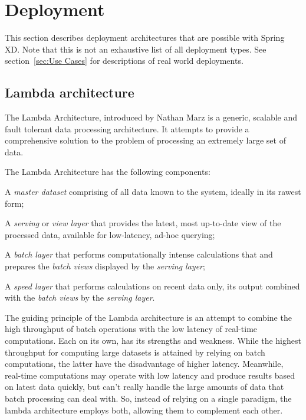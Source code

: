 \section{Deployment}
This section describes deployment architectures that are possible with Spring XD.
Note that this is not an exhaustive list of all deployment types. See
section~\ref{sec:Use Cases} for descriptions of real world deployments.

\subsection{Lambda architecture}

The Lambda Architecture, introduced by Nathan Marz \cite{lambda-architecture-paper}
is a generic, scalable and fault tolerant data  processing architecture. It attempts
to provide a comprehensive solution to the problem of processing an extremely large
set of data.

The Lambda Architecture has the following components:

\begin{itemize*}
\item A \emph{master dataset} comprising of all data known to the system,
ideally in its rawest form;
\item A \emph{serving} or \emph{view layer} that provides the latest,
most up-to-date view of the processed data, available for low-latency,
ad-hoc querying;
\item A \emph{batch layer} that performs computationally intense 
calculations that and prepares the \emph{batch views} displayed by the 
\emph{serving layer};
\item A \emph{speed layer} that performs calculations on recent data only, 
its output combined with the \emph{batch views} by the \emph{serving layer}.
\end{itemize*}

The guiding principle of the Lambda architecture is an attempt to combine the
high throughput of batch operations with the low latency of real-time
computations. Each on its own, has its strengths and weakness. While the
highest throughput for computing large datasets is attained by relying on
batch computations, the latter have the disadvantage of higher latency.
Meanwhile, real-time computations may operate with low latency and produce
results based on latest data quickly, but can't really handle the large
amounts of data that batch processing can deal with. So, instead of relying
on a single paradigm, the lambda architecture employs both, allowing them
to complement each other.

